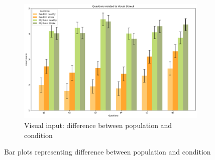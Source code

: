 \begin{figure}[htbp]
\begin{subfigure}[htbp]{0.5\textwidth}
        \includegraphics[width=\textwidth]{bar_plots/plot_pop_visual.png}
        \caption{Visual input: difference between population and condition}
        \label{fig: bar_audiovisual_pop} 
    \end{subfigure} 
    \caption{Bar plots representing difference between population and condition}
    \label{fig: difference in population}
\end{figure}

